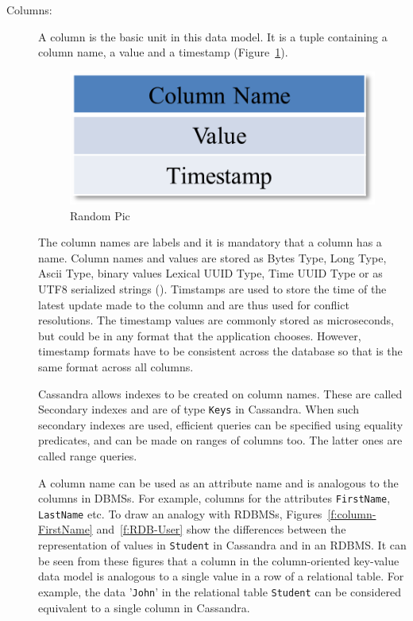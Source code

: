 \begin{description}
\item[Columns:]  A column is the basic unit in this data model.  It is a tuple
containing a column name,   a value and a timestamp (Figure~\ref{f:column}). 

\begin{figure}[h]
	\centering
	\includegraphics[width=.4\textwidth]{./figure/Example/Column.png}
	\caption{Random Pic}\label{f:column}
\end{figure}

The column names are labels  and it is mandatory that a column has a
name.  Column names and values are stored as Bytes Type,   Long Type,  
Ascii Type,   binary values Lexical UUID Type,   Time UUID Type or as UTF8
serialized strings ().  Timstamps are used to store the time of the
latest update made to the column and are thus used for conflict resolutions.  The
timestamp values are commonly stored as microseconds,   but could be in any format
that the application chooses.  However,   timestamp formats have to be consistent
across the database so that is the same format across all columns. 

Cassandra allows indexes to be created on column names.  These are called
Secondary indexes and are of type \texttt{Keys} in Cassandra.  When such secondary indexes
are used,   efficient queries can be specified using equality predicates,   and
can be made on ranges of columns too.  The latter ones are called range queries. 

A column name can be used as an attribute name and is analogous to the columns
in \acp{DBMS}.  For example,   columns for the attributes \texttt{FirstName},  
\texttt{LastName} etc.  To draw an analogy with \acp{RDBMS},  
Figures~\ref{f:column-FirstName} and~\ref{f:RDB-User} show the differences
between the representation of values in \texttt{Student} in Cassandra and in an \ac{RDBMS}. 
It can be seen from these figures that a column in the column-oriented key-value
data model is analogous to a single value in a row of a relational table.  For
example,   the data '\texttt{John}' in the relational table \texttt{Student} can
be considered equivalent to a single column in Cassandra. 


\end{description}
